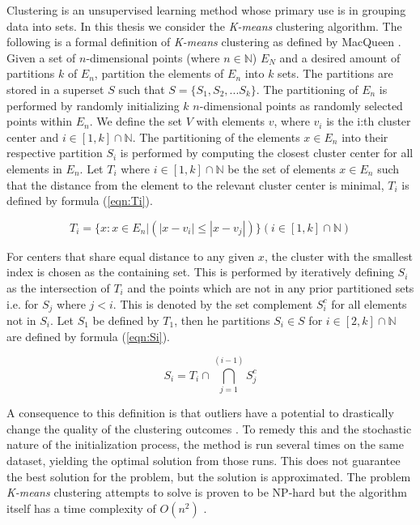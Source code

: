 Clustering is an unsupervised learning method whose primary use is in grouping data into sets. In this thesis we consider the \textit{K-means} clustering algorithm. The following is a formal definition of \textit{K-means} clustering as defined by MacQueen \cite{macqueen}. Given a set of $n$-dimensional points (where $n \in \mathbb{N}$) $E_N$ and a desired amount of partitions $k$ of $E_n$, partition the elements of $E_n$ into $k$ sets. The partitions are stored in a superset $S$ such that $S = \{S_1, S_2, ... S_k\}$. The partitioning of $E_n$ is performed by randomly initializing $k$ $n$-dimensional points as randomly selected points within $E_n$. We define the set $V$ with elements $v$, where $v_i$ is the i:th cluster center and $i \in [1, k] \cap \mathbb{N}$. The partitioning of the elements $x \in E_n$ into their respective partition $S_i$ is performed by computing the closest cluster center for all elements in $E_n$. Let $T_i$ where $i \in [1, k] \cap \mathbb{N}$ be the set of elements $x \in E_n$ such that the distance from the element to the relevant cluster center is minimal, $T_i$ is defined by formula (\ref{eqn:Ti}).

\begin{equation}
\label{eqn:Ti}
T_i = \{x : x \in E_n | (|x - v_i| \leq |x - v_j|)\} (i \in [1, k] \cap \mathbb{N})
\end{equation}

For centers that share equal distance to any given $x$, the cluster with the smallest index is chosen as the containing set. This is performed by iteratively defining $S_i$ as the intersection of $T_i$ and the points which are not in any prior partitioned sets i.e. for $S_j$ where $j < i$. This is denoted by the set complement $S_i^c$ for all elements not in $S_i$. Let $S_1$ be defined by $T_1$, then he partitions $S_i \in S$ for $i \in [2, k] \cap \mathbb{N}$ are defined by formula (\ref{eqn:Si}).

\begin{equation}
\label{eqn:Si}
S_i = T_i \cap \bigcap_{j=1}^{(i-1)} S_j^c
\end{equation}

A consequence to this definition is that outliers have a potential to drastically change the quality of the clustering outcomes \cite{chawla2013k}. To remedy this and the stochastic nature of the initialization process, the method is run several times on the same dataset, yielding the optimal solution from those runs. This does not guarantee the best solution for the problem, but the solution is approximated. The problem \textit{K-means} clustering attempts to solve is proven to be NP-hard \cite{chawla2013k, mahajan2009planar} but the algorithm itself has a time complexity of $O(n^2)$ \cite{pakhira2014linear}.


